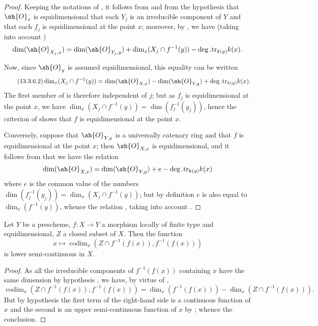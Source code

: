 \begin{proof}
Keeping the notations of , it follows from  and from the hypothesis that $\sh{O}_x$ is equidimensional that each $Y_j$ is an irreducible component of $Y$ and that each $f_j$ is equidimensional at the point $x$; moreover, by , we have (taking into account )
\[
  \dim(\sh{O}_{X_j,x})=\dim(\sh{O}_{Y_j,y})+\dim_x(X_j\cap f^{-1}(y))-\deg.\mathrm{tr}_{k(y)}k(x).
\]


Now, since $\sh{O}_y$ is assumed equidimensional, this equality can be written
\[
\tag{13.3.6.2}
\label{IV.13.3.6.2}
  \dim_x(X_j\cap f^{-1}(y))=\dim(\sh{O}_{X,x})-\dim(\sh{O}_{Y,y})+\deg.\mathrm{tr}_{k(y)}k(x).
\]
The first member of  is therefore independent of $j$; but as $f_j$ is equidimensional at the point $x$, we have $\dim_x(X_j\cap f^{-1}(y))=\dim(f_j^{-1}(y_j))$, hence the criterion of  shows that $f$ is equidimensional at the point $x$.

Conversely, suppose that $\sh{O}_{Y,y}$ is a universally catenary ring and that $f$ is equidimensional at the point $x$; then  $\sh{O}_{X,x}$ is equidimensional, and it follows from  that we have the relation
\[
  \dim(\sh{O}_{X,x})=\dim(\sh{O}_{Y,y})+e-\deg.\mathrm{tr}_{k(y)}k(x)
\]
where $e$ is the common value of the numbers $\dim(f_j^{-1}(y_j))=\dim_x(X_j\cap f^{-1}(y))$; but by definition $e$ is also equal to $\dim_x(f^{-1}(y))$, whence the relation , taking into account .
\end{proof}

\begin{proposition}[13.3.7]
\label{IV.13.3.7}
Let $Y$ be a prescheme, $f:X\to Y$ a morphism locally of finite type and equidimensional, $Z$ a closed subset of $X$.
Then the function
\[
\tag{13.3.7.1}
  x\mapsto\operatorname{codim}_x(Z\cap f^{-1}(f(x)),f^{-1}(f(x)))
\]
is lower semi-continuous in $X$.
\end{proposition}

\begin{proof}
As all the irreducible components of $f^{-1}(f(x))$ containing $x$ have the same dimension by hypothesis , we have, by virtue of ,
\[
  \operatorname{codim}_x(Z\cap f^{-1}(f(x)),f^{-1}(f(x)))=\dim_x(f^{-1}(f(x)))-\dim_x(Z\cap f^{-1}(f(x))).
\]
But by hypothesis the first term of the right-hand side is a continuous function of $x$  and the second is an upper semi-continuous function of $x$ by ; whence the conclusion.
\end{proof}

